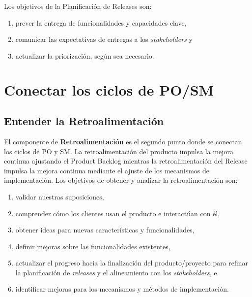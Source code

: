 \documentclass{article} %
\begin{document}
\noindent 

\noindent Los objetivos de la Planificaci\'{o}n de Releases  son:

\begin{enumerate}
\item  prever la entrega de funcionalidades y capacidades clave,

\item  comunicar las expectativas de entregas a los \textit{stakeholders} y

\item  actualizar la priorizaci\'{o}n, seg\'{u}n sea necesario.
\end{enumerate}

\noindent 
\section{Conectar los ciclos de PO/SM}

\noindent 
\subsection{Entender la Retroalimentaci\'{o}n}

\noindent 

\noindent El componente de \textbf{Retroalimentaci\'{o}n }es el segundo punto donde se conectan los ciclos de PO y SM. La retroalimentaci\'{o}n del producto impulsa la mejora continua ajustando el Product Backlog mientras la retroalimentaci\'{o}n del Release  impulsa la mejora continua mediante el ajuste de los mecanismos de implementaci\'{o}n. Los objetivos de obtener y analizar la retroalimentaci\'{o}n son:

\begin{enumerate}
\item  validar nuestras suposiciones,

\item  comprender c\'{o}mo los clientes usan el producto e interact\'{u}an con \'{e}l,

\item  obtener ideas para nuevas caracter\'{i}sticas y funcionalidades,

\item  definir mejoras sobre las funcionalidades existentes,

\item  actualizar el progreso hacia la finalizaci\'{o}n del producto/proyecto para refinar la planificaci\'{o}n de \textit{releases }y el alineamiento con los \textit{stakeholders}, e

\item  identificar mejoras para  los mecanismos y m\'{e}todos de implementaci\'{o}n.
\end{enumerate}
\end{document}
